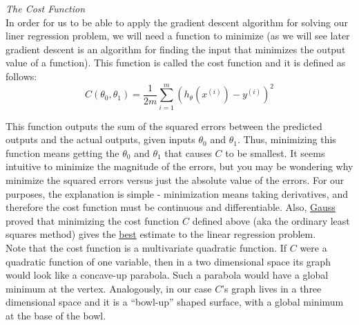 \documentclass[11pt,a4paper,oneside]{report}
\begin{document}
{\it\Large\color{red} The Cost Function}\\

In order for us to be able to apply the gradient descent algorithm for solving our liner regression problem, we will need a function to minimize (as we will see later gradient descent is an algorithm for finding the input that minimizes the output value of a function). This function is called the cost function and it is defined as follows:
\[
C(\theta_0, \theta_1) = \frac{1}{2m}\sum\limits_{i=1}^m(h_{\theta} (x^{(i)}) - y^{(i)})^2
\]

This function outputs the sum of the squared errors between the predicted outputs and the actual outputs, given inputs $\theta_0$ and $\theta_1$. Thus, minimizing this function means getting the $\theta_0$ and $\theta_1$ that causes $C$ to be smallest. It seems intuitive to minimize the magnitude of the errors, but you may be wondering why minimize the squared errors versus just the absolute value of the errors. For our purposes, the explanation is simple - minimization means taking derivatives, and therefore the cost function must be continuous and differentiable. Also, \href{https://en.wikipedia.org/wiki/Carl_Friedrich_Gauss}{Gauss} proved that minimizing the cost function $C$ defined above (aka the ordinary least squares method) gives the \href{http://en.wikipedia.org/wiki/Gauss%E2%80%93Markov_theorem}{best} estimate to the linear regression problem.\\

Note that the cost function is a multivariate quadratic function. If $C$ were a quadratic function of one variable, then in a two dimensional space its graph would look like a concave-up parabola. Such a parabola would have a global minimum at the vertex. Analogously, in our case $C$'s graph lives in a three dimensional space and it is a ``bowl-up'' shaped surface, with a global minimum at the base of the bowl.\\
\end{document}
